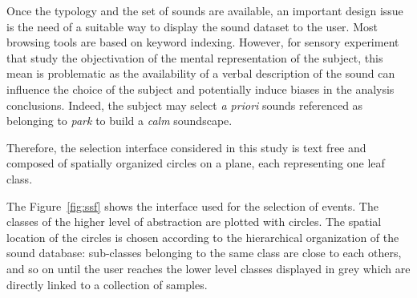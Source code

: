 \documentclass[preprint,12pt]{elsarticle}
\begin{document}


Once the typology and the set of sounds are available, an important design issue is the need of a suitable way to display the sound dataset to the user. Most browsing tools are based on keyword indexing. However, for sensory experiment that study the objectivation of the mental representation of the subject, this mean is problematic as the availability of a verbal description of the sound can influence the choice of the subject and potentially induce biases in the analysis conclusions. Indeed, the subject may select \textit{a priori} sounds referenced as belonging to \emph{park} to build a \emph{calm} soundscape.


Therefore, the selection interface considered in this study is text free and composed of spatially organized circles on a plane, each representing one leaf class.


The Figure~\ref{fig:ssf} shows the interface used for the selection of events. The classes of the higher level of abstraction are plotted with circles. The spatial location of the circles is chosen according to the hierarchical organization of the sound database: sub-classes belonging to the same class are close to each others, and so on until the user reaches the lower level classes displayed in grey which are directly linked to a collection of samples.
\end{document}
